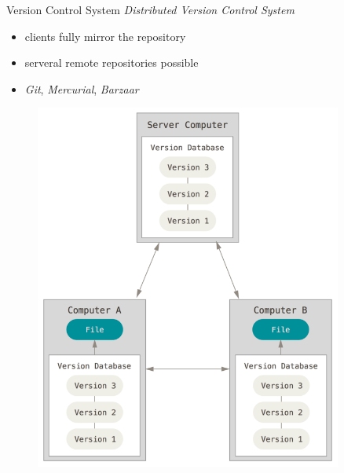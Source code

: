 \begin{frame}[fragile]{Version Control System}
    \emph{Distributed Version Control System}
    \vspace{1cm}

    \begin{minipage}{0.49\textwidth}
        \begin{itemize}
            \item clients fully mirror the repository
            \item serveral remote repositories possible
            \item \emph{Git}, \emph{Mercurial}, \emph{Barzaar}
        \end{itemize}
    \end{minipage}
    \begin{minipage}{0.49\textwidth}
        \begin{figure}
            \centering
            \includegraphics[width=0.9\textwidth]{img/distributed_vcs.png}
        \end{figure}
    \end{minipage}

\end{frame}
